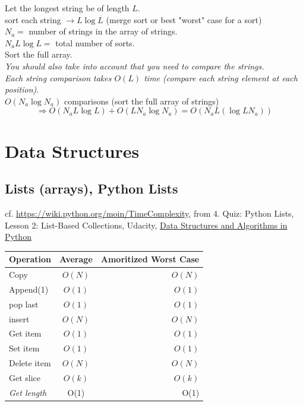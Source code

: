 \documentclass[10pt]{amsart}
\begin{document}
\begin{multicols*}{2}
Let the longest string be of length $L$. \\
sort each string $\to L\log{L}$ (merge sort or best "worst" case for a sort) \\
$N_a= $ number of strings in the array of strings. \\
$N_a L \log{L} = $ total number of sorts. \\

Sort the full array.\\
\emph{You should also take into account that you need to compare the strings.} \\
\emph{Each string comparison takes $O(L)$ time (compare each string element at each position)}. \\
$O(N_a \log{N_a})$ comparisons (sort the full array of strings) \\

\[
\Longrightarrow \boxed{ O(N_a L \log{L}) + O(L N_a \log{N_a}) = O(N_aL (\log{LN_a})) }
\]

\section{Data Structures}

\subsection{Lists (arrays), Python Lists}

cf. \url{https://wiki.python.org/moin/TimeComplexity}, from 4. Quiz: Python Lists, Lesson 2: List-Based Collections, Udacity, \href{https://classroom.udacity.com/courses/ud513/lessons/7117335401/concepts/78894523130923}{Data Structures and Algorithms in Python}
\begin{center}
	\begin{tabular}{ l | c | r }
		\hline
		Operation & Average & Amoritized Worst Case \\ \hline
		Copy & $O(N)$ & $O(N)$ \\ \hline
		Append(1) & $O(1)$ & $O(1)$ \\ \hline
		pop last & $O(1)$ & $O(1)$ \\ \hline
		insert & $O(N)$ & $O(N)$ \\ \hline
		Get item & $O(1)$ & $O(1)$ \\ \hline
		Set item & $O(1)$ & $O(1)$ \\ \hline
		Delete item & $O(N)$ & $O(N)$ \\ \hline
		Get slice & $O(k)$ & $O(k)$ \\ \hline		
		\emph{Get length} & O(1) & O(1) \\ \hline
		\hline
	\end{tabular}
\end{center}


\end{multicols*}
\end{document}
